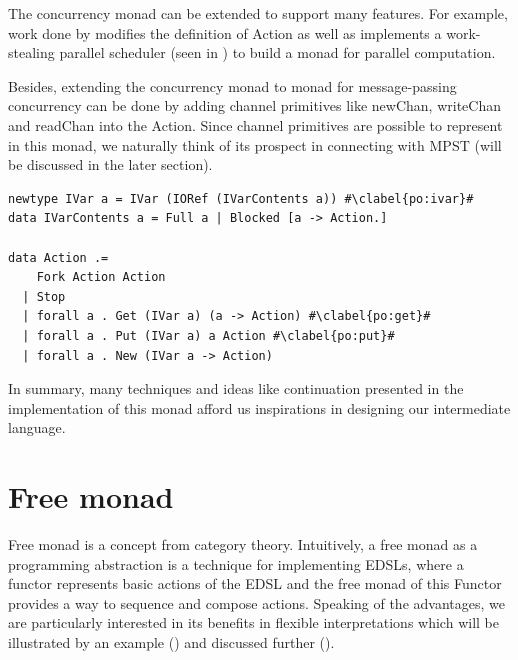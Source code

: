 The concurrency monad can be extended to support many features. For example, work done by \cite{marlowMonadDeterministicParallelism} modifies the definition of Action as well as implements a work-stealing parallel scheduler (seen in ) to build a monad for parallel computation. 

Besides, extending the concurrency monad to monad for message-passing concurrency can be done by adding channel primitives like newChan, writeChan and readChan into the Action. Since channel primitives are possible to represent in this monad, we naturally think of its prospect in connecting with MPST (will be discussed in the later section).
\begin{code}
  \begin{verbatim}
newtype IVar a = IVar (IORef (IVarContents a)) #\clabel{po:ivar}#
data IVarContents a = Full a | Blocked [a -> Action.]
    
data Action .=
    Fork Action Action
  | Stop
  | forall a . Get (IVar a) (a -> Action) #\clabel{po:get}#
  | forall a . Put (IVar a) a Action #\clabel{po:put}#
  | forall a . New (IVar a -> Action)
  \end{verbatim}
  \label{b:mo:c3}
\end{code}

In summary, many techniques and ideas like continuation presented in the implementation of this monad afford us inspirations in designing our intermediate language.
\section{Free monad} \label{b:fm}
Free monad\cite{contributorsCatsFreeMonads} is a concept from category theory. Intuitively, a free monad as a programming abstraction is a technique for implementing EDSLs, where a functor represents basic actions of the EDSL and the free monad of this Functor provides a way to sequence and compose actions. Speaking of the advantages, we are particularly interested in its benefits in flexible interpretations which will be illustrated by an example () and discussed further ().
